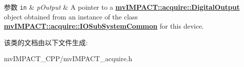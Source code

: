 \begin{DoxyParams}[1]{参数}
\mbox{\tt in}  & {\em p\+Output} & A pointer to a {\bfseries \hyperlink{classmv_i_m_p_a_c_t_1_1acquire_1_1_digital_output}{mv\+I\+M\+P\+A\+C\+T\+::acquire\+::\+Digital\+Output}} object obtained from an instance of the class {\bfseries \hyperlink{classmv_i_m_p_a_c_t_1_1acquire_1_1_i_o_sub_system_common}{mv\+I\+M\+P\+A\+C\+T\+::acquire\+::\+I\+O\+Sub\+System\+Common}} for this device. \\
\hline
\end{DoxyParams}


该类的文档由以下文件生成\+:\begin{DoxyCompactItemize}
\item 
mv\+I\+M\+P\+A\+C\+T\+\_\+\+C\+P\+P/mv\+I\+M\+P\+A\+C\+T\+\_\+acquire.\+h\end{DoxyCompactItemize}
